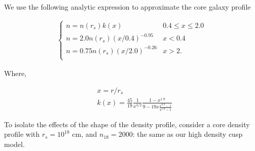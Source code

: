 \documentclass[usenatbib,fleqn]{mnras}
\begin{document}
We use the following analytic expression to approximate the core
galaxy profile

\begin{align}
\begin{cases}
n=n(r_s) k(x) & 0.4 \leq x\leq 2.0\\
n = 2.0 n(r_s) (x/0.4)^{-0.95} & x < 0.4\\
n = 0.75 n(r_s) (x/2.0)^{-0.26} & x>2.\\
\end{cases}
\label{eq:cores}
\end{align}

Where, 

\begin{align}
  &x=r/r_s\\\nonumber
  &k(x)=\frac{45}{19} \frac{1}{x^{3/2}} \frac{1-x^{1.9}}{9-19
      x\frac{x^{0.9}-1}{x^{1.9}-1}}
\end{align}

To isolate the effects of the shape of the density profile, consider a
core density profile with $r_s=10^{18}$ cm, and $n_{18}=2000$: the
same as our high density cusp model.

\clearpage
  \footnotesize{
    
    
  }
\end{document}
